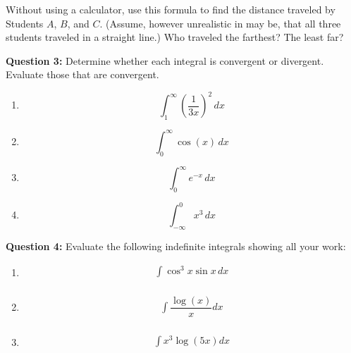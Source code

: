 \documentclass[12pt]{article}
\begin{document}
Without using a calculator, use this formula to find the distance traveled by Students $A$, $B$, and $C$. (Assume, however unrealistic in may be, that all three students traveled in a straight line.) Who traveled the farthest? The least far? 

\pagebreak

\noindent \textbf{Question 3:} Determine whether each integral is convergent or divergent. Evaluate those that are convergent.
\begin{multicols}{2}
\begin{enumerate}
\item $$\int_1^{\infty} \left(\frac{1}{3x}\right)^2 \,dx$$
\item $$\int_0^{\infty} \cos (x) \, dx$$
\item $$\int_0^{\infty} e^{-x} \,dx$$
\item $$\int_{-\infty}^0 x^3 \,dx$$
\end{enumerate}
\end{multicols}

\noindent \textbf{Question 4:} Evaluate the following indefinite integrals showing all your work:

\begin{enumerate}
\item
\begin{align*}
\int \cos^3x \sin x \,dx\\
\end{align*}


\item 
\begin{align*}
\int \dfrac{\log(x)}{x} dx\\
\end{align*}


\item 
\begin{align*}
\int  x^3\log(5x) dx\\
\end{align*}



\end{enumerate}
\end{document}

